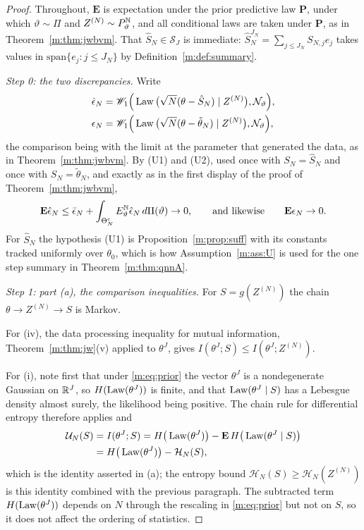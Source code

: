 \begin{proof}
Throughout, $\mathbf{E}$ is expectation under the prior predictive law $\mathbf{P}$, under which $\vartheta\sim\Pi$ and $Z^{(N)}\sim P^{\mathbb{N}}_\vartheta$, and all conditional laws are taken under $\mathbf{P}$, as in Theorem~\ref{m:thm:jwbvm}. That $\hat S_N\in\mathcal S_J$ is immediate: $\hat S^{J_N}_N=\sum_{j\le J_N}S_{N,j}e_j$ takes values in $\mathrm{span}\{e_j:j\le J_N\}$ by Definition~\ref{m:def:summary}.

\emph{Step 0: the two discrepancies.} Write
\[
\begin{aligned}
\hat\epsilon_N&=\mathscr{W}_1\Big(\operatorname{Law}\big(\sqrt N(\theta-\hat S_N)\mid Z^{(N)}\big),\mathcal{N}_\vartheta\Big),\\
\epsilon_N&=\mathscr{W}_1\Big(\operatorname{Law}\big(\sqrt N(\theta-\tilde\theta_N)\mid Z^{(N)}\big),\mathcal{N}_\vartheta\Big),
\end{aligned}
\]
the comparison being with the limit at the parameter that generated the data, as in Theorem~\ref{m:thm:jwbvm}. By (U1) and (U2), used once with $S_N=\hat S_N$ and once with $S_N=\tilde\theta_N$, and exactly as in the first display of the proof of Theorem~\ref{m:thm:jwbvm},
\begin{equation}\label{m:eq:abcE}
\mathbf{E}\hat\epsilon_N\le\bar\epsilon_N+\int_{\Theta_N^c}E^{\mathbb{N}}_\vartheta\hat\epsilon_N\,d\Pi(\vartheta)\to0,\qquad\text{and likewise}\qquad\mathbf{E}\epsilon_N\to0 .
\end{equation}
For $\hat S_N$ the hypothesis (U1) is Proposition~\ref{m:prop:suff} with its constants tracked uniformly over $\theta_0$, which is how Assumption~\ref{m:ass:U} is used for the one step summary in Theorem~\ref{m:thm:qnnA}.

\emph{Step 1: part (a), the comparison inequalities.} For $S=g(Z^{(N)})$ the chain $\theta\to Z^{(N)}\to S$ is Markov.

For (iv), the data processing inequality for mutual information, Theorem~\ref{m:thm:jw}(v) applied to $\theta^J$, gives $I(\theta^J;S)\le I(\theta^J;Z^{(N)})$.

For (i), note first that under \eqref{m:eq:prior} the vector $\theta^J$ is a nondegenerate Gaussian on $\mathbb{R}^J$, so $H(\operatorname{Law}(\theta^J))$ is finite, and that $\operatorname{Law}(\theta^J\mid S)$ has a Lebesgue density almost surely, the likelihood being positive. The chain rule for differential entropy therefore applies and
\[
\begin{aligned}
\mathcal U_N(S)&=I(\theta^J;S)=H\big(\operatorname{Law}(\theta^J)\big)-\mathbf{E}\,H\big(\operatorname{Law}(\theta^J\mid S)\big)\\
&=H\big(\operatorname{Law}(\theta^J)\big)-\mathcal H_N(S) ,
\end{aligned}
\]
which is the identity asserted in (a); the entropy bound $\mathcal H_N(S)\ge\mathcal H_N(Z^{(N)})$ is this identity combined with the previous paragraph. The subtracted term $H(\operatorname{Law}(\theta^J))$ depends on $N$ through the rescaling in \eqref{m:eq:prior} but not on $S$, so it does not affect the ordering of statistics.


\end{proof}
